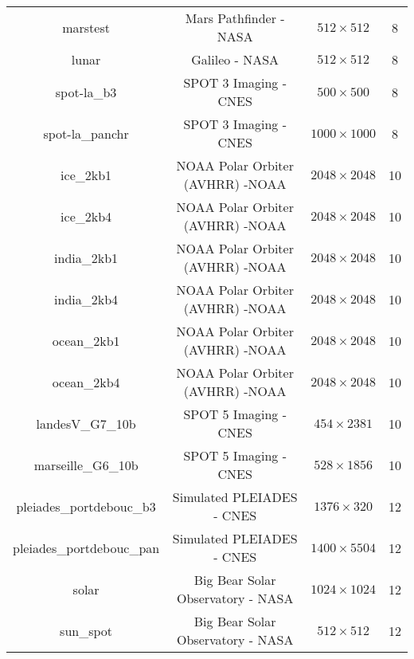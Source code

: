 \begin{table}[h]
\begin{adjustbox}{max width=\textwidth}
\begin{tabular}{@{}cccc@{}}
marstest                  & Mars Pathfinder - NASA            & $512\times 512$             & 8                          \\
lunar                     & Galileo - NASA                    & $512\times 512$             & 8                          \\
spot-la\_b3               & SPOT 3 Imaging - CNES             & $500\times 500$             & 8                          \\
spot-la\_panchr           & SPOT 3 Imaging - CNES             & $1000\times 1000$           & 8                          \\
ice\_2kb1                 & NOAA Polar Orbiter (AVHRR) -NOAA  & $2048\times 2048$           & 10                         \\
ice\_2kb4                 & NOAA Polar Orbiter (AVHRR) -NOAA  & $2048\times 2048$           & 10                         \\
india\_2kb1               & NOAA Polar Orbiter (AVHRR) -NOAA  & $2048\times 2048$           & 10                         \\
india\_2kb4               & NOAA Polar Orbiter (AVHRR) -NOAA  & $2048\times 2048$           & 10                         \\
ocean\_2kb1               & NOAA Polar Orbiter (AVHRR) -NOAA  & $2048\times 2048$           & 10                         \\
ocean\_2kb4               & NOAA Polar Orbiter (AVHRR) -NOAA  & $2048\times 2048$           & 10                         \\
landesV\_G7\_10b          & SPOT 5 Imaging - CNES             & $454\times 2381$            & 10                         \\
marseille\_G6\_10b        & SPOT 5 Imaging - CNES             & $528\times 1856$            & 10                         \\
pleiades\_portdebouc\_b3  & Simulated PLEIADES - CNES         & $1376\times 320$            & 12                         \\
pleiades\_portdebouc\_pan & Simulated PLEIADES - CNES         & $1400\times 5504$           & 12                         \\
solar                     & Big Bear Solar Observatory - NASA & $1024\times 1024$           & 12                         \\
sun\_spot                 & Big Bear Solar Observatory - NASA & $512\times 512$             & 12                         \\

\end{tabular}
\end{adjustbox}
\end{table}

